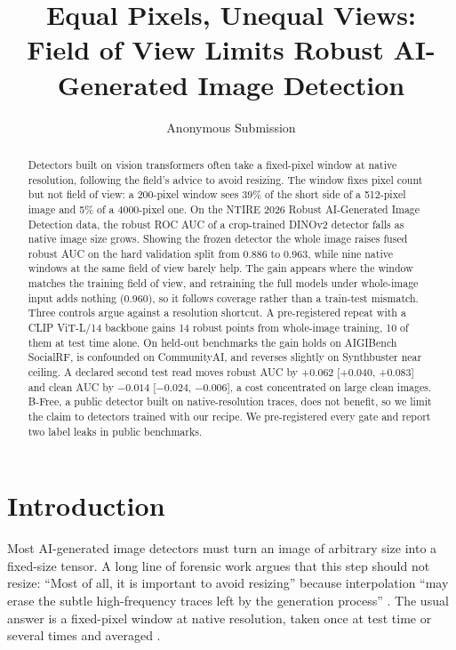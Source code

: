 \documentclass[letterpaper]{article} %
\title{Equal Pixels, Unequal Views:\\Field of View Limits Robust AI-Generated Image Detection}
\author{Anonymous Submission}
\begin{document}
\maketitle

\begin{abstract}
Detectors built on vision transformers often take a fixed-pixel window at
native resolution, following the field's advice to avoid resizing. The window
fixes pixel count but not field of view: a 200-pixel window sees 39\% of the
short side of a 512-pixel image and 5\% of a 4000-pixel one. On the NTIRE 2026
Robust AI-Generated Image Detection data, the robust ROC AUC of a crop-trained
DINOv2 detector falls as native image size grows. Showing the frozen detector
the whole image raises fused robust AUC on the hard validation split from
0.886 to 0.963, while nine native windows at the same field of view barely
help. The gain appears where the window matches the training field of view,
and retraining the full models under whole-image input adds nothing (0.960),
so it follows
coverage rather than a train-test mismatch. Three controls argue against a
resolution shortcut. A pre-registered repeat with a CLIP ViT-L/14 backbone
gains 14 robust points from whole-image training, 10 of them at test time
alone. On held-out benchmarks the gain holds on AIGIBench SocialRF, is
confounded on CommunityAI, and reverses slightly on Synthbuster near ceiling.
A declared second test read moves robust AUC by +0.062 [+0.040, +0.083] and
clean AUC by $-0.014$ [$-0.024$, $-0.006$], a cost concentrated on large
clean images. B-Free, a public detector built on native-resolution traces,
does not benefit, so we limit the claim to detectors trained with our recipe.
We pre-registered every gate and report two label leaks in public
benchmarks.
\end{abstract}

\section{Introduction}
\label{sec:intro}

Most AI-generated image detectors must turn an image of arbitrary size into a
fixed-size tensor. A long line of forensic work argues that this step should
not resize: ``Most of all, it is important to avoid resizing'' because
interpolation ``may erase the subtle high-frequency traces left by the
generation process'' \cite{corvi2023detection}. The usual answer is a
fixed-pixel window at native resolution, taken once at test time or several
times and averaged \cite{corvi2023detection,li2025safe,guillaro2025bfree,konstantinidou2025texturecrop}.
\end{document}
